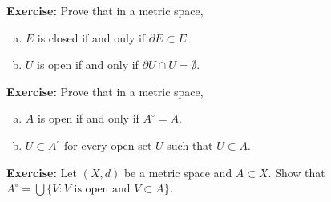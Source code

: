 \documentclass[10pt,aspectratio=149]{beamer}
\begin{document}
\begin{frame}

\textbf{Exercise:}
Prove that in a metric space,
\begin{enumerate}[a)]
\item
\pause
$E$ is closed if and only if $\partial E \subset E$.
\item
\pause
$U$ is open if and only if $\partial U \cap U = \emptyset$.
\end{enumerate}

\pause
\medskip

\textbf{Exercise:}
Prove that in a metric space,
\begin{enumerate}[a)]
\pause
\item
$A$ is open if and only if $A^\circ = A$.
\pause
\item
$U \subset A^\circ$
for every open set $U$ such that $U \subset A$.
\end{enumerate}

\pause
\medskip

\textbf{Exercise:}
Let $(X,d)$ be a metric space and $A \subset X$.  Show that
$A^\circ = \bigcup \{ V : V \text{ is open and } V \subset A \}$.

\end{frame}
\end{document}
